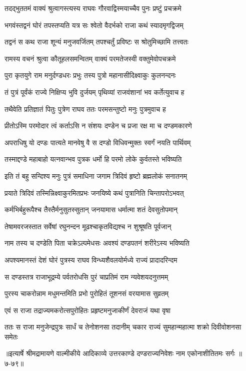 
\twolineshloka
{तदद्भुततमं वाक्यं श्रुत्वागस्त्यस्य राघवः}
{गौरवाद्विस्मयाच्चैव पुनः प्रष्टुं प्रचक्रमे} %

\twolineshloka
{भगवंस्तद्वनं घोरं तपस्तप्यति यत्र सः}
{श्वेतो वैदर्भको राजा कथं स्यादमृगद्विजम्} %

\twolineshloka
{तद्वनं स कथ राजा शून्यं मनुजवर्जितम्}
{तपश्चर्तुं प्रविष्टः स श्रोतुमिच्छामि तत्त्वतः} %

\twolineshloka
{रामस्य वचनं श्रुत्वा कौतूहलसमन्वितम्}
{वाक्यं परमतेजस्वी वक्तुमेवोपचक्रमे} %

\twolineshloka
{पुरा कृतयुगे राम मनुर्दण्डधरः प्रभुः}
{तस्य पुत्रो महानासीदिक्ष्वाकुः कुलनन्दनः} %

\twolineshloka
{तं पुत्रं पूर्वंकं राज्ये निक्षिप्य भुवि दुर्जयम्}
{पृथिव्यां राजवंशानां भव कर्तेत्युवाच ह} %

\twolineshloka
{तथैवेति प्रतिज्ञातं पितुः पुत्रेण राघव}
{ततः परमसन्तुष्टो मनुः पुत्रमुवाच ह} %

\twolineshloka
{प्रीतोऽस्मि परमोदार त्वं कर्ताऽसि न संशयः}
{दण्डेन च प्रजा रक्ष मा च दण्डमकारणे} %

\twolineshloka
{अपराधिषु यो दण्डः पात्यते मानवेषु वै}
{स दण्डो विधिवन्मुक्तः स्वर्गं नयति पार्थिवम्} %

\twolineshloka
{तस्माद्दण्डे महाबाहो यत्नवान्भव पुत्रक}
{धर्मो हि परमो लोके कुर्वतस्ते भविष्यति} %

\twolineshloka
{इति तं बहु सन्दिश्य मनुः पुत्रं समाधिना}
{जगाम त्रिदिवं हृष्टो ब्रह्मलोकं सनातनम्} %

\twolineshloka
{प्रयाते त्रिदिवं तस्मिन्निक्ष्वाकुरमितप्रभः}
{जनयिष्ये कथं पुत्रानिति चिन्तापरोऽभवत्} %

\twolineshloka
{कर्मभिर्बहुरूपैश्च तैस्तैर्मनुसुतस्सुतान्}
{जनयामास धर्मात्मा शतं देवसुतोपमान्} %

\twolineshloka
{तेषामवरजस्तात सर्वेषां रघुनन्दन}
{मूढश्चाकृतविद्यश्च न शुश्रूषति पूर्वजान्} %

\twolineshloka
{नाम तस्य च दण्डेति पिता चक्रेऽल्पमेधसः}
{अवश्यं दण्डपतनं शरीरेऽस्य भविष्यति} %

\twolineshloka
{अपश्यमानस्तं देशं घोरं पुत्रस्य राघव}
{विन्ध्यशैवलयोर्मध्ये राज्यं प्रादादरिन्दम} %

\twolineshloka
{स दण्डस्तत्र राजाभूद्रम्ये पर्वतरोधसि}
{पुरं चाप्रतिमं राम न्यवेशयदनुत्तमम्} %

\twolineshloka
{पुरस्य चाकरोन्नाम मधुमन्तमिति प्रभो}
{पुरोहितं तूशनसं वरयामास सुव्रतम्} %

\twolineshloka
{एवं स राजा तद्राज्यमकरोत्सपुरोहितः}
{प्रहृष्टमनुजाकीर्णं देवराजं यथा वृषा} %

\twolineshloka
{ततः स राजा मनुजेन्द्रपुत्रः सार्धं च तेनोशनसा तदानीम्}
{चकार राज्यं सुमहान्महात्मा शक्रो दिवीवोशनसा समेतः} %


॥इत्यार्षे श्रीमद्रामायणे वाल्मीकीये आदिकाव्ये उत्तरकाण्डे दण्डराज्यनिवेशः नाम एकोनाशीतितमः सर्गः ॥७-७९॥
